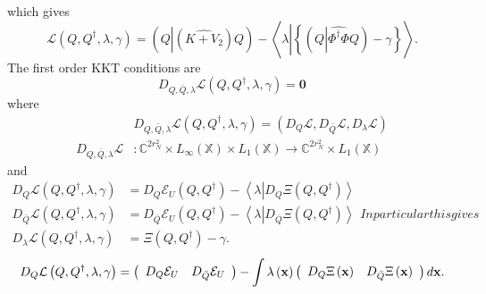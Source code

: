 \documentclass[aps,preprint]{revtex4}%
\begin{document}
which gives
\begin{equation}
\mathcal{L}\left(  Q,Q^{\dagger},\lambda,\gamma\right)  =\left(  Q\left\vert
\left(  \widehat{K+V_{2}}\right)  Q\right.  \right)  -\left\langle
\lambda\left\vert \left\{  \left(  Q\left\vert \widehat{\Phi^{\dagger}\Phi
}Q\right.  \right)  -\gamma\right\}  \right.  \right\rangle .
\end{equation}
The first order KKT conditions \cite{KKT} are%
\begin{equation}
D_{Q,\bar{Q},\lambda}\mathcal{L}\left(  Q,Q^{\dagger},\lambda,\gamma\right)
=\mathbf{0}%
\end{equation}
where
\begin{align}
&  D_{Q,\bar{Q},\lambda}\mathcal{L}\left(  Q,Q^{\dagger},\lambda
,\gamma\right)  =\left(  D_{Q}\mathcal{L},D_{\bar{Q}}\mathcal{L},D_{\lambda
}\mathcal{L}\right) \nonumber\\
D_{Q,\bar{Q},\lambda}\mathcal{L}  &  :\mathbb{C}^{2r_{N}^{2}}\times L_{\infty
}\left(  \mathbb{X}\right)  \times L_{1}\left(  \mathbb{X}\right)
\rightarrow\mathbb{C}^{2r_{N}^{2}}\times L_{1}\left(  \mathbb{X}\right)
\end{align}
and%
\begin{subequations}
\begin{align}
D_{Q}\mathcal{L}\left(  Q,Q^{\dagger},\lambda,\gamma\right)   &
=D_{Q}\mathcal{E}_{U}\left(  Q,Q^{\dagger}\right)  -\left\langle
\lambda\left\vert D_{Q}\Xi\left(  Q,Q^{\dagger}\right)  \right.  \right\rangle
\\
D_{\bar{Q}}\mathcal{L}\left(  Q,Q^{\dagger},\lambda,\gamma\right)   &
=D_{\bar{Q}}\mathcal{E}_{U}\left(  Q,Q^{\dagger}\right)  -\left\langle
\lambda\left\vert D_{\bar{Q}}\Xi\left(  Q,Q^{\dagger}\right)  \right.
\right\rangle \\
D_{\lambda}\mathcal{L}\left(  Q,Q^{\dagger},\lambda,\gamma\right)   &
=\Xi\left(  Q,Q^{\dagger}\right)  -\gamma.
\end{align}
In particular this gives
\end{subequations}
\begin{equation}
D_{Q}\mathcal{L}\left(  Q,Q^{\dagger},\lambda,\gamma\right)  =\left(
\begin{array}
[c]{cc}%
D_{Q}\mathcal{E}_{U} & D_{\bar{Q}}\mathcal{E}_{U}%
\end{array}
\right)  -\int\lambda\left(  \mathbf{x}\right)  \left(
\begin{array}
[c]{cc}%
D_{Q}\Xi\left(  \mathbf{x}\right)  & D_{\bar{Q}}\Xi\left(  \mathbf{x}\right)
\end{array}
\right)  d\mathbf{x.}%
\end{equation}
\end{document}

